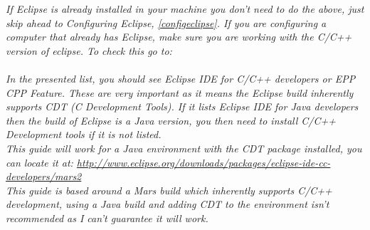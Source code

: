 {{{
}
\justifying
\parindent=0pt
\par
\emph{
If Eclipse is already installed in your machine you don't need to do the above, just skip ahead to Configuring Eclipse, \ref{configeclipse}. If you are configuring a computer that already has Eclipse, make sure you are working with the C/C++ version of eclipse. To check this go to:
\\
\-\ \hspace{20pt} 
\\
In the presented list, you should see Eclipse IDE for C/C++ developers or EPP CPP Feature. These are very important as it means the Eclipse build inherently supports CDT (C Development Tools). If it lists Eclipse IDE for Java developers then the build of Eclipse is a Java version, you then need to install C/C++ Development tools if it is not listed.
\\
This guide will work for a Java environment with the CDT package installed, you can locate it at:
\url{http://www.eclipse.org/downloads/packages/eclipse-ide-cc-developers/mars2}
\\
This guide is based around a Mars build which inherently supports C/C++ development, using a Java build and adding CDT to the environment isn't recommended as I can't guarantee it will work.
}
\newpage
}}
